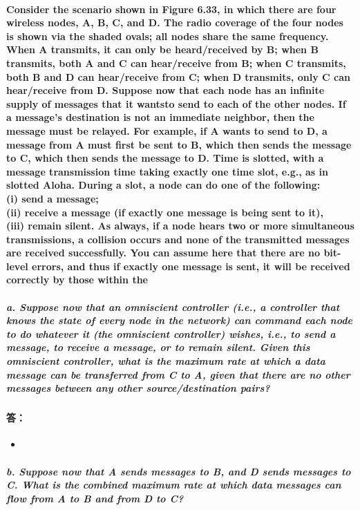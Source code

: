 \documentclass[a4paper]{ctexart}
\begin{document}
\paragraph*{Consider the scenario shown in Figure 6.33, in which there are four wireless nodes, A, B, C, and D. The radio coverage of the four nodes is shown via the shaded ovals; all nodes share the same frequency. When A transmits, it can only be heard/received by B; when B transmits, both A and C can hear/receive from B; when C transmits, both B and D can hear/receive from C; when D transmits, only C can hear/receive from D. Suppose now that each node has an infinite supply of messages that it wantsto send to each of the other nodes. If a message’s destination is not an immediate neighbor, then the message must be relayed. For example, if A wants to send to D, a message from A must first be sent to B, which then sends the message to C, which then sends the message to D. Time is slotted, with a message transmission time taking exactly one time slot, e.g., as in slotted Aloha. During a slot, a node can do one of the following: \\
(i) send a message;\\
(ii) receive a message (if exactly one message is being sent to it),\\
(iii) remain silent. As always, if a node hears two or more simultaneous transmissions, a collision occurs and none of the transmitted messages are received successfully. You can assume here that there are no bit-level errors, and thus if exactly one message is sent, it will be received correctly by those within the\\}
\subparagraph*{a. Suppose now that an omniscient controller (i.e., a controller that knows the state of every node in the network) can command each node to do whatever it (the omniscient controller) wishes, i.e., to send a message, to receive a message, or to remain silent. Given this omniscient controller, what is the maximum rate at which a data message can be transferred from C to A, given that there are no other messages between any other source/destination pairs?}
\paragraph*{答：} 
\begin{itemize}
    \item 
\end{itemize}
\subparagraph*{b. Suppose now that A sends messages to B, and D sends messages to C. What is the combined maximum rate at which data messages can flow from A to B and from D to C?}
\end{document}
